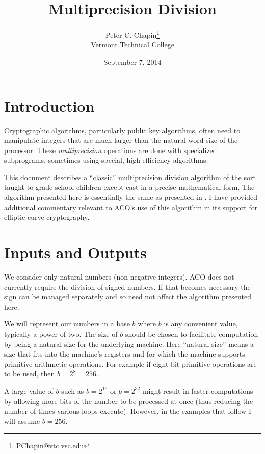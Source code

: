 \documentclass{article}
\begin{document}
\title{Multiprecision Division}
\author{Peter C. Chapin\thanks{PChapin@vtc.vsc.edu}\\
  Vermont Technical College}
\date{September 7, 2014}
\maketitle


\section{Introduction}
\label{sec:introduction}

Cryptographic algorithms, particularly public key algorithms, often need to manipulate integers
that are much larger than the natural word size of the processor. These \textit{multiprecision}
operations are done with specialized subprograms, sometimes using special, high efficiency
algorithms.

This document describes a ``classic'' multiprecision division algorithm of the sort taught to
grade school children except cast in a precise mathematical form. The algorithm presented here
is essentially the same as presented in \cite{knuth-seminumerical}. I have provided additional
commentary relevant to ACO's use of this algorithm in its support for elliptic curve
cryptography.

\section{Inputs and Outputs}
\label{sec:inputs-outputs}

We consider only natural numbers (non-negative integers). ACO does not currently require the
division of signed numbers. If that becomes necessary the sign can be managed separately and so
need not affect the algorithm presented here.

We will represent our numbers in a base $b$ where $b$ is any convenient value, typically a power
of two. The size of $b$ should be chosen to facilitate computation by being a natural size for
the underlying machine. Here ``natural size'' means a size that fits into the machine's
registers and for which the machine supports primitive arithmetic operations. For example if
eight bit primitive operations are to be used, then $b = 2^8 = 256$.

A large value of $b$ such as $b = 2^{16}$ or $b = 2^{32}$ might result in faster computations by
allowing more bits of the number to be processed at once (thus reducing the number of times
various loops execute). However, in the examples that follow I will assume $b = 256$.
\end{document}
